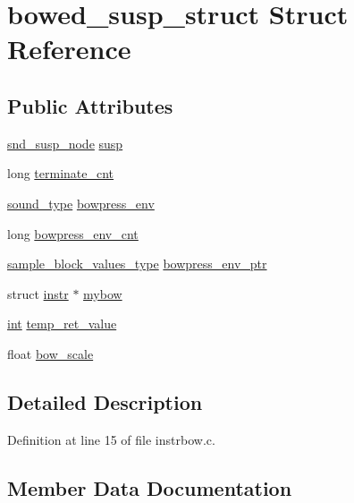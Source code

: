 \hypertarget{structbowed__susp__struct}{}\section{bowed\+\_\+susp\+\_\+struct Struct Reference}
\label{structbowed__susp__struct}
\subsection*{Public Attributes}
\begin{DoxyCompactItemize}
\item 
\hyperlink{sound_8h_a6b268203688a934bd798ceb55f85d4c0}{snd\+\_\+susp\+\_\+node} \hyperlink{structbowed__susp__struct_a0b9c9ecf375c072584afd8ceccda1e0e}{susp}
\item 
long \hyperlink{structbowed__susp__struct_a8ab8386ebc09edefd6bde416f1fe7355}{terminate\+\_\+cnt}
\item 
\hyperlink{sound_8h_a792cec4ed9d6d636d342d9365ba265ea}{sound\+\_\+type} \hyperlink{structbowed__susp__struct_acf8c959e51a82dda0d5c8edb536bbb2f}{bowpress\+\_\+env}
\item 
long \hyperlink{structbowed__susp__struct_aeb7c5688850e99fec088db58820c2d81}{bowpress\+\_\+env\+\_\+cnt}
\item 
\hyperlink{sound_8h_a83d17f7b465d1591f27cd28fc5eb8a03}{sample\+\_\+block\+\_\+values\+\_\+type} \hyperlink{structbowed__susp__struct_a6f0a99130bd00e52e575dde97d20494f}{bowpress\+\_\+env\+\_\+ptr}
\item 
struct \hyperlink{structinstr}{instr} $\ast$ \hyperlink{structbowed__susp__struct_ac07da92a930c8d139ba9ed7945953f15}{mybow}
\item 
\hyperlink{xmltok_8h_a5a0d4a5641ce434f1d23533f2b2e6653}{int} \hyperlink{structbowed__susp__struct_ac4df431025675a1f6878d88fbdc3280d}{temp\+\_\+ret\+\_\+value}
\item 
float \hyperlink{structbowed__susp__struct_a1a9ca5150d12c6b6d8bdcd3e6fd752bc}{bow\+\_\+scale}
\end{DoxyCompactItemize}


\subsection{Detailed Description}


Definition at line 15 of file instrbow.\+c.



\subsection{Member Data Documentation}
